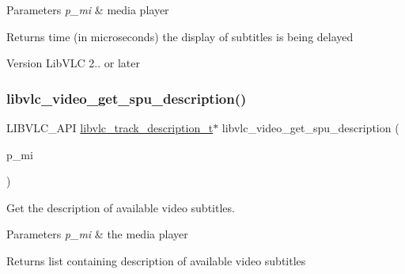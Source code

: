 \begin{DoxyParams}{Parameters}
{\em p\+\_\+mi} & media player \\
\hline
\end{DoxyParams}
\begin{DoxyReturn}{Returns}
time (in microseconds) the display of subtitles is being delayed 
\end{DoxyReturn}
\begin{DoxyVersion}{Version}
Lib\+V\+LC 2.. or later 
\end{DoxyVersion}
\mbox{\label{group__libvlc__video_ga3edaa14e1cb0b80edc1636319ab05cf7}} 
\subsubsection{\texorpdfstring{libvlc\+\_\+video\+\_\+get\+\_\+spu\+\_\+description()}{libvlc\_video\_get\_spu\_description()}}
{\footnotesize\ttfamily L\+I\+B\+V\+L\+C\+\_\+\+A\+PI \hyperlink{structlibvlc__track__description__t}{libvlc\+\_\+track\+\_\+description\+\_\+t}$\ast$ libvlc\+\_\+video\+\_\+get\+\_\+spu\+\_\+description (\begin{DoxyParamCaption}\item[{libvlc\+\_\+media\+\_\+player\+\_\+t $\ast$}]{p\+\_\+mi }\end{DoxyParamCaption})}

Get the description of available video subtitles.


\begin{DoxyParams}{Parameters}
{\em p\+\_\+mi} & the media player \\
\hline
\end{DoxyParams}
\begin{DoxyReturn}{Returns}
list containing description of available video subtitles 
\end{DoxyReturn}
\mbox{\label{group__libvlc__video_ga826fb9efaf5275574373763dfc915f4c}} 
